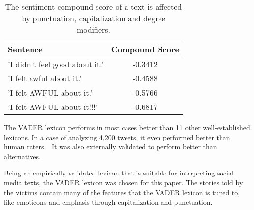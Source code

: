 \begin{table}
    \centering
    \begin{tabular}{lc}
        \hline
        \textbf{Sentence} & \textbf{Compound Score} \\ \hline
        'I didn't feel good about it.' & -0.3412  \\
        'I felt awful about it.' & -0.4588 \\ 
        'I felt AWFUL about it.' & -0.5766 \\ 
        'I felt AWFUL about it!!!' & -0.6817 \\ \hline
    \end{tabular}
    \caption{The sentiment compound score of a text is affected by punctuation, capitalization and degree modifiers.}
    \label{tab:sentiment_analysis_heuristics_effects}
\end{table}


The VADER lexicon performs in most cases better than 11 other well-established lexicons. In a case of analyzing 4,200 tweets, it even performed better than human raters.~\cite{hutto2014vader} It was also externally validated to perform better than alternatives.~\cite{al2020evaluating}\cite{min2020comparative}

Being an empirically validated lexicon that is suitable for interpreting social media texts, the VADER lexicon was chosen for this paper. The stories told by the victims contain many of the features that the VADER lexicon is tuned to, like emoticons and emphasis through capitalization and punctuation.

